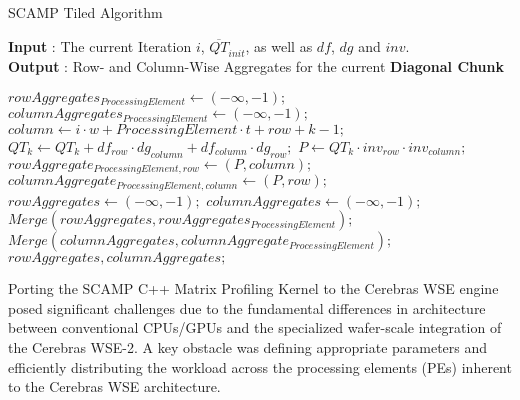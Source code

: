 \begin{algorithm}
    \caption{SCAMP Tiled Algorithm}
    \label{alg:scamp_tiled_algorithm}
    \hspace*{\algorithmicindent} \textbf{Input} : The current Iteration $i$, $\overline{QT}_{init}$, as well as $df$, $dg$ and $inv$.\\
    \hspace*{\algorithmicindent} \textbf{Output} : Row- and Column-Wise Aggregates for the current \textbf{Diagonal Chunk}
    \begin{algorithmic}[1]
            \State $rowAggregates_{ProcessingElement} \gets (-\infty, -1);$
            \State $columnAggregates_{ProcessingElement} \gets (-\infty, -1);$
                    \State $column \gets i \cdot w + ProcessingElement \cdot t + row + k - 1;$
                    \State $QT_k \gets QT_k + df_{row} \cdot dg_{column} + df_{column} \cdot dg_{row};$
                    \State $P \gets QT_k \cdot inv_{row} \cdot inv_{column};$
                        \State $rowAggregate_{ProcessingElement, row} \gets (P, column);$
                    \EndIf
                        \State $columnAggregate_{ProcessingElement, column} \gets (P, row);$
                    \EndIf
                \EndFor
            \EndFor
        \EndFor
        \State $rowAggregates \gets (-\infty, -1);$
        \State $columnAggregates \gets (-\infty, -1);$
            \State $Merge(rowAggregates, rowAggregates_{ProcessingElement});$
            \State $Merge(columnAggregates, columnAggregate_{ProcessingElement});$
        \EndFor\\
        \Return $rowAggregates, columnAggregates;$
    \end{algorithmic}
\end{algorithm}

Porting the SCAMP C++ Matrix Profiling Kernel to the Cerebras WSE engine posed significant challenges due to the fundamental differences in architecture between conventional CPUs/GPUs and the specialized wafer-scale integration of the Cerebras WSE-2. A key obstacle was defining appropriate parameters and efficiently distributing the workload across the processing elements (PEs) inherent to the Cerebras WSE architecture.

